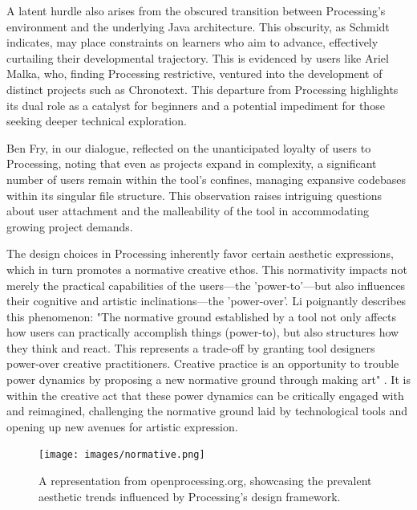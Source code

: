A latent hurdle also arises from the obscured transition between Processing's environment and the underlying Java architecture. This obscurity, as Schmidt indicates, may place constraints on learners who aim to advance, effectively curtailing their developmental trajectory. This is evidenced by users like Ariel Malka, who, finding Processing restrictive, ventured into the development of distinct projects such as Chronotext. This departure from Processing highlights its dual role as a catalyst for beginners and a potential impediment for those seeking deeper technical exploration.

Ben Fry, in our dialogue, reflected on the unanticipated loyalty of users to Processing, noting that even as projects expand in complexity, a significant number of users remain within the tool's confines, managing expansive codebases within its singular file structure. This observation raises intriguing questions about user attachment and the malleability of the tool in accommodating growing project demands.

The design choices in Processing inherently favor certain aesthetic expressions, which in turn promotes a normative creative ethos. This normativity impacts not merely the practical capabilities of the users—the 'power-to'—but also influences their cognitive and artistic inclinations—the 'power-over'. Li poignantly describes this phenomenon: "The normative ground established by a tool not only affects how users can practically accomplish things (power-to), but also structures how they think and react. This represents a trade-off by granting tool designers power-over creative practitioners. Creative practice is an opportunity to trouble power dynamics by proposing a new normative ground through making art" \parencite[65]{liRethinkingPowerDynamics2023}. It is within the creative act that these power dynamics can be critically engaged with and reimagined, challenging the normative ground laid by technological tools and opening up new avenues for artistic expression.

\begin{figure}
    \centering
    \texttt{[image: images/normative.png]}
    \caption{A representation from openprocessing.org, showcasing the prevalent aesthetic trends influenced by Processing's design framework.}
    \label{fig:normative}
\end{figure}
